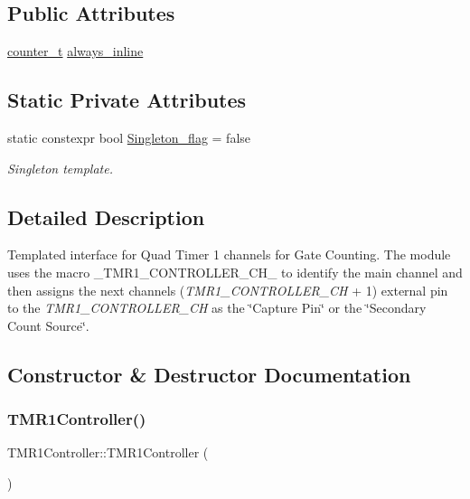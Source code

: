 \subsection*{Public Attributes}
\begin{DoxyCompactItemize}
\item 
\hyperlink{types_8hpp_a22f279793847eba127de149437848c48}{counter\+\_\+t} \hyperlink{classTMR1Controller_adce8e8a496510485a88ccc5b88595672}{always\+\_\+inline}
\end{DoxyCompactItemize}
\subsection*{Static Private Attributes}
\begin{DoxyCompactItemize}
\item 
static constexpr bool \hyperlink{classTMR1Controller_a532b729ca9a7c28e5f4d221f80487241}{Singleton\+\_\+flag} = false
\begin{DoxyCompactList}\small\item\em Singleton template. \end{DoxyCompactList}\end{DoxyCompactItemize}


\subsection{Detailed Description}
Templated interface for Quad Timer 1 channels for Gate Counting. The module uses the macro {\ttfamily \+\_\+\+T\+M\+R1\+\_\+\+C\+O\+N\+T\+R\+O\+L\+L\+E\+R\+\_\+\+C\+H\+\_\+} to identify the main channel and then assigns the next channel\textquotesingle{}s ({\itshape T\+M\+R1\+\_\+\+C\+O\+N\+T\+R\+O\+L\+L\+E\+R\+\_\+\+CH} + 1) external pin to the {\itshape T\+M\+R1\+\_\+\+C\+O\+N\+T\+R\+O\+L\+L\+E\+R\+\_\+\+CH} as the \char`\"{}\+Capture Pin\char`\"{} or the \char`\"{}\+Secondary Count Source\char`\"{}. 

\subsection{Constructor \& Destructor Documentation}
\mbox{\label{classTMR1Controller_aebc677e795f673c6520d5a03eb6aa4f2}} 
\subsubsection{\texorpdfstring{T\+M\+R1\+Controller()}{TMR1Controller()}}
{\footnotesize\ttfamily T\+M\+R1\+Controller\+::\+T\+M\+R1\+Controller (\begin{DoxyParamCaption}{ }\end{DoxyParamCaption})\hspace{0.3cm}{\ttfamily [inline]}}



